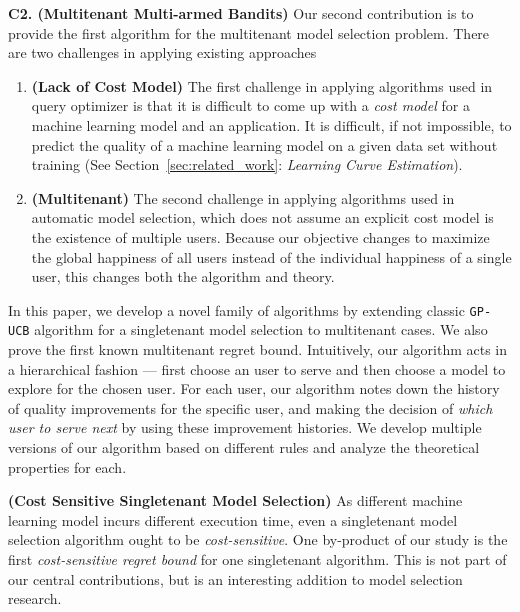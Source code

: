 \vspace{0.5em} \noindent
{\bf C2. (Multitenant Multi-armed Bandits)} Our second contribution
is to provide the first algorithm for the multitenant model selection
problem. There are two challenges in applying existing approaches 
\begin{enumerate}
  \vspace{-0.25em}
  \item {\bf (Lack of Cost Model)} The first challenge in applying
  algorithms used in query optimizer is that it is difficult
  to come up with a {\em cost model} for a machine learning model
  and an application. It is difficult, if not impossible, to predict
  the quality of a machine learning model on a given data set without
  training (See Section~\ref{sec:related_work}: {\em Learning Curve Estimation}). 
  \vspace{-1.5em}
  \item {\bf (Multitenant)} The second challenge in applying
  algorithms used in automatic model selection, which does not 
  assume an explicit cost model is the existence of multiple users. 
  Because our objective changes to maximize the global happiness
  of all users instead of the individual happiness of a single user, 
  this changes both the algorithm and theory.
\end{enumerate}
\vspace{-0.25em}
In this paper, we develop a novel family of algorithms by extending 
classic \texttt{GP-UCB} algorithm for a singletenant model
selection to multitenant cases. We also prove the first 
known multitenant regret bound. Intuitively, our algorithm
acts in a hierarchical fashion --- first choose an user
to serve and then choose a model to explore for the chosen user.
For each user, our algorithm notes down the history of quality
improvements for the specific user, and making the decision
of {\em which user to serve next} by using these improvement histories. 
We develop multiple versions of our algorithm based on different
rules and analyze the theoretical properties for each.

{\bf (Cost Sensitive Singletenant Model Selection)} As different
machine learning model incurs different execution time, even
a singletenant model selection algorithm ought to be {\em cost-sensitive}.
One by-product of our study is the first {\em cost-sensitive
regret bound} for one singletenant algorithm. This is not part of
our central contributions, but is an interesting addition 
to model selection research.

